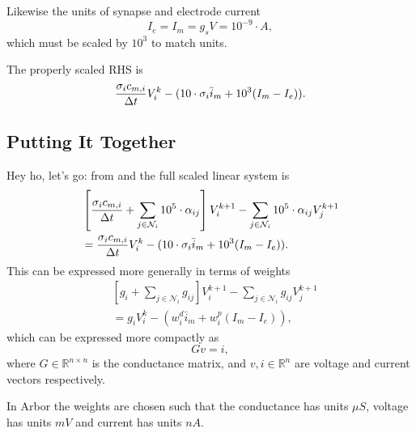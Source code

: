 Likewise the units of synapse and electrode current
\begin{equation}
    \label{eq:Im_unit}
    \unit{ I_e } = \unit{ I_m } = \unit{ g_s } \unit{ V }
                 = 10^{-9}\cdot A,
\end{equation}
which must be scaled by $10^3$ to match units.

The properly scaled RHS is
\begin{equation}
    \label{eq:linsys_RHS_scaled}
    \frac{\sigma_i c_{m,i}}{\Delta t} V_i^k -
        (10\cdot\sigma_i \bar{i}_m + 10^3(I_m - I_e)).
\end{equation}

\subsection{Putting It Together}
Hey ho, let's go: from  and  the full scaled linear system is
\begin{align}
    &
    \left[
        \frac{\sigma_i c_{m,i}}{\Delta t} + \sum_{j\in\mathcal{N}_i} {10^5\cdot\alpha_{ij}}
    \right]
    V_i^{k+1} - \sum_{j\in\mathcal{N}_i} { 10^5\cdot\alpha_{ij} V_j^{k+1}} \nonumber \\
       & =
    \frac{\sigma_i c_{m,i}}{\Delta t} V_i^k -
        (10\cdot\sigma_i \bar{i}_m + 10^3(I_m - I_e)).
\end{align}
This can be expressed more generally in terms of weights
\begin{align}
    &
    \left[
        g_i + \sum_{j\in\mathcal{N}_i} {g_{ij}}
    \right]
    V_i^{k+1} - \sum_{j\in\mathcal{N}_i} { g_{ij} V_j^{k+1}} \nonumber \\
       & =
    g_i V_i^k -
        (w_i^d \bar{i}_m + w_i^p(I_m - I_e)),
\end{align}
which can be expressed more compactly as
\begin{equation}
    Gv=i,
\end{equation}
where $G\in\mathbb{R}^{n\times n}$ is the conductance matrix, and $v, i \in \mathbb{R}^{n}$ are voltage and current vectors respectively.

In Arbor the weights are chosen such that the conductance has units $\mu S$, voltage has units $mV$ and current has units $nA$.

